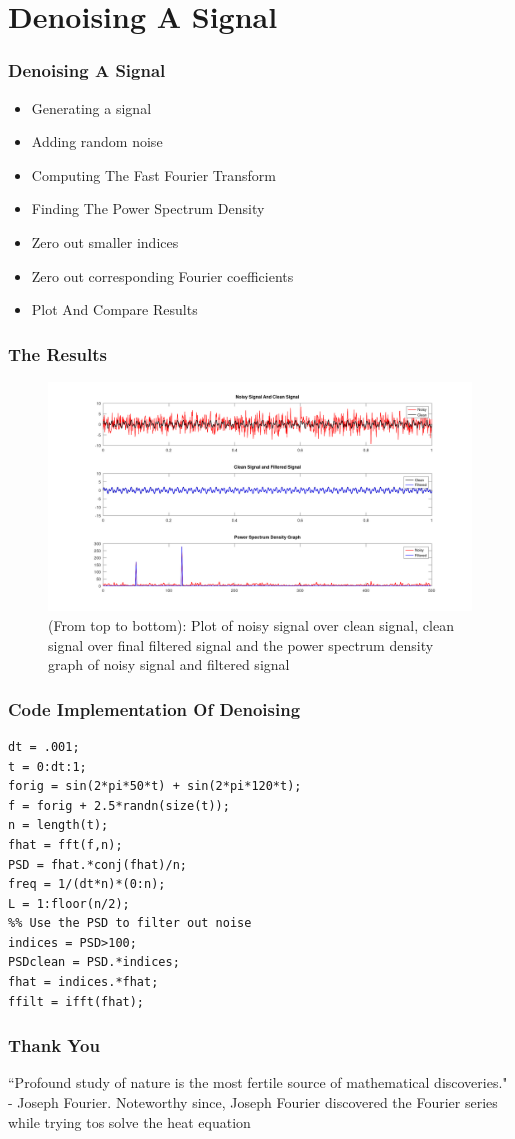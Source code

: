 \documentclass{beamer}
\begin{document}
\section{Denoising A Signal}
\begin{frame}
	\frametitle{Denoising A Signal}
	\begin{itemize}
		\item<1-> Generating a signal
		\item<2-> Adding random noise
		\item<3-> Computing The Fast Fourier Transform
		\item<4-> Finding The Power Spectrum Density
		\item<5-> Zero out smaller indices
		\item<6-> Zero out corresponding Fourier coefficients
		\item<7-> Plot And Compare Results 
	\end{itemize}
\end{frame}
\begin{frame}
	\frametitle{The Results}
\begin{figure}[!ht]
    \centering
    \includegraphics[trim = 0 100 0 50, width=\linewidth,clip]{../plots/denoise.png}
    \caption{(From top to bottom): Plot of noisy signal over clean signal, clean signal over final filtered signal and the power spectrum density graph of noisy signal and filtered signal}
    \label{fig:dft_denoise}
\end{figure}
\end{frame}
\begin{frame}[fragile]
	\frametitle{Code Implementation Of Denoising}
	\begin{lstlisting}
dt = .001;
t = 0:dt:1;
forig = sin(2*pi*50*t) + sin(2*pi*120*t); 
f = forig + 2.5*randn(size(t)); 
n = length(t);
fhat = fft(f,n); 
PSD = fhat.*conj(fhat)/n; 
freq = 1/(dt*n)*(0:n); 
L = 1:floor(n/2); 
%% Use the PSD to filter out noise
indices = PSD>100; 
PSDclean = PSD.*indices; 
fhat = indices.*fhat; 
ffilt = ifft(fhat); 
	\end{lstlisting}
\end{frame}

\begin{frame}
\end{frame}
\begin{frame}
	\frametitle{Thank You}
	``Profound study of nature is the most fertile source of mathematical discoveries." - Joseph Fourier.
\pagebreak
	Noteworthy since, Joseph Fourier discovered the Fourier series while trying tos solve the heat equation
\end{frame}
\end{document}
